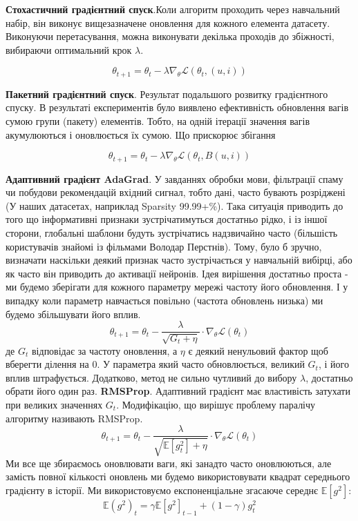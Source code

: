 \textbf{Стохастичний градієнтний спуск}.Коли алгоритм проходить через навчальний набір, він виконує вищезазначене оновлення для кожного елемента датасету. Виконуючи перетасування, можна виконувати декілька проходів до збіжності, вибираючи оптимальний крок $\lambda$.

\[\theta_{t+1} = \theta_{t} - \lambda  \nabla_{\theta} \mathcal{L}(\theta_t, (u,i)) \]

\textbf{Пакетний градієнтний спуск}. Результат подальшого розвитку градієнтного спуску. В результаті експериментів було виявлено ефективність обновлення вагів сумою групи (пакету) елементів. Тобто, на одній ітерації значення вагів акумулюються і оновлюється їх сумою. Що прискорює збігання

\[\theta_{t+1} = \theta_{t} - \lambda  \nabla_{\theta} \mathcal{L}(\theta_t, B(u,i)) \]

\textbf{Адаптивний градієнт AdaGrad}. У завданнях обробки мови, фільтрації спаму чи побудови рекомендацій вхідний сигнал, тобто дані, часто бувають розріджені (У наших датасетах, наприклад Sparsity 99.99+\%). Така ситуація приводить до того що інформативні признаки зустрічатимуться достатньо рідко, і із іншої сторони, глобальні шаблони будуть зустрічатись надзвичайно часто (більшість користувачів знайомі із фільмами Володар Перстнів). Тому, було б зручно, визначати наскільки деякий признак часто зустрічається у навчальній вибірці, або як часто він приводить до активації нейронів. Ідея вирішення достатньо проста - ми будемо зберігати для кожного параметру мережі частоту його обновлення. І у випадку коли параметр навчається повільно (частота обновлень низька) ми будемо збільшувати його вплив.  
\[ \theta_{t + 1} = \theta_t - \frac{\lambda}{\sqrt{G_t + \eta}} \cdot \nabla_{\theta}\mathcal{L}(\theta_t)\]
де $G_t$ відповідає за частоту оновлення, а $\eta$ є деякий ненульовий фактор щоб вберегти ділення на 0. У параметра який часто обновлюється, великий $G_t$, і його вплив штрафується. Додатково, метод не сильно чутливий до вибору $\lambda$, достатньо обрати його один раз.
\newpage
\textbf{RMSProp}. Адаптивний градієнт має властивість затухати при великих значеннях $G_t$. Модифікацію, що вирішує проблему паралічу алгоритму називають RMSProp. 
\[ \theta_{t + 1} = \theta_t - \frac{\lambda}{\sqrt{\mathbb{E}[g^{2}_t] + \eta}} \cdot \nabla_{\theta}\mathcal{L}(\theta_t)
\]
Ми все ще збираємось оновлювати ваги, які занадто часто оновлюються, але замість повної кількості оновлень ми будемо використовувати квадрат  середнього градієнту в історії. Ми використовуємо експоненціальне згасаюче середнє $\mathbb{E}[g^2]$:
\[\mathbb{E}(g^{2})_t = \gamma \mathbb{E}[g^{2}]_{t-1}+ (1 - \gamma)g^{2}_t\]
